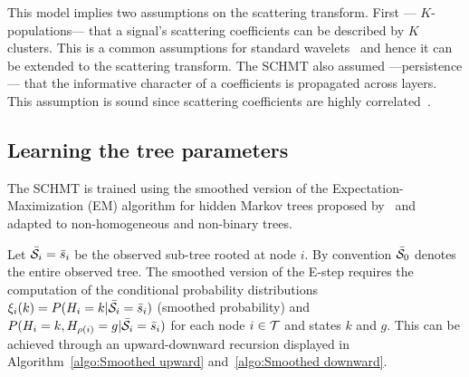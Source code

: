 \documentclass{article}
\begin{document}
    
    This model implies two assumptions on the scattering transform. First --- $K$-populations--- that a signal’s scattering coefficients can be described by $K$ clusters. This is a common assumptions for standard wavelets~\citep{kingsbury2001complex} and hence it can be extended to the scattering transform. The SCHMT also assumed ---persistence--- that the informative character of a coefficients is propagated across layers. This assumption is sound since scattering coefficients are highly correlated~\citep{Oyallon}.
    
  \subsection{Learning the tree parameters}
    \label{subsec:SCHMT/Learning}    

    The SCHMT is trained using the smoothed version of the Expectation-Maximization (EM) algorithm \citep{someone} for hidden Markov trees proposed by~\citep{Durand} and adapted to non-homogeneous and non-binary trees.
    
    Let $\bar{\mathcal{S}}_{i}= \bar{s}_{i}$ be the observed sub-tree rooted at node $i$. By convention $\bar{\mathcal{S}}_{0}$ denotes the entire observed tree. The smoothed version of the E-step requires the computation of the conditional probability distributions $\xi_{i}(k) = P(H_{i}=k | \bar{\mathcal{S}}_{i}= \bar{s}_{i})$ (smoothed probability) and $P(H_{i}=k, H_{\rho(i)}=g | \bar{\mathcal{S}}_{i}= \bar{s}_{i})$ for each node $i \in \mathcal{T}$ and states $k$ and $g$. This can be achieved through an upward-downward recursion displayed in Algorithm~\ref{algo:Smoothed upward} and~\ref{algo:Smoothed downward}.
    
\end{document}
